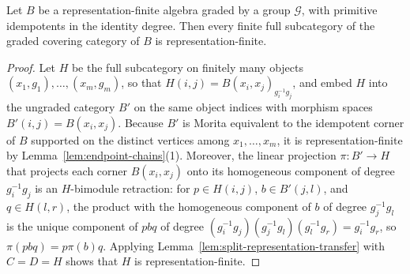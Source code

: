 \begin{lemma}
\label{lem:homogeneous-projection}
Let $B$ be a representation-finite algebra graded by a group $\mathcal G$,
with primitive idempotents in the identity degree. Then every finite full
subcategory of the graded covering category of $B$ is representation-finite.
\end{lemma}
\begin{proof}
Let $H$ be the full subcategory on finitely many objects $(x_1,g_1),\ldots,(x_m,g_m)$,
so that $H(i,j)=B(x_i,x_j)_{g_i^{-1}g_j}$, and embed $H$ into the ungraded
category $B'$ on the same object indices with morphism spaces
$B'(i,j)=B(x_i,x_j)$. Because $B'$ is Morita equivalent to the idempotent
corner of $B$ supported on the distinct vertices among $x_1,\ldots,x_m$, it
is representation-finite by Lemma~\ref{lem:endpoint-chains}(1). Moreover, the
linear projection $\pi:B'\to H$ that projects each corner $B(x_i,x_j)$ onto
its homogeneous component of degree $g_i^{-1}g_j$ is an $H$-bimodule
retraction: for $p\in H(i,j)$, $b\in B'(j,l)$, and $q\in H(l,r)$, the product
with the homogeneous component of $b$ of degree $g_j^{-1}g_l$ is the unique
component of $pbq$ of degree $(g_i^{-1}g_j)(g_j^{-1}g_l)(g_l^{-1}g_r)=g_i^{-1}g_r$,
so $\pi(pbq)=p\pi(b)q$. Applying Lemma~\ref{lem:split-representation-transfer}
with $C=D=H$ shows that $H$ is representation-finite.
\end{proof}

